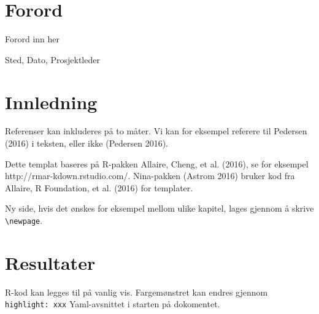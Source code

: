 \documentclass[11pt, a4paper]{article}
\newenvironment{Shaded}{\begin{snugshade}}{\end{snugshade}}
\newcommand{\KeywordTok}[1]{\textcolor[rgb]{0.13,0.29,0.53}{\textbf{{#1}}}}
\newcommand{\DataTypeTok}[1]{\textcolor[rgb]{0.13,0.29,0.53}{{#1}}}
\newcommand{\DecValTok}[1]{\textcolor[rgb]{0.00,0.00,0.81}{{#1}}}
\newcommand{\FloatTok}[1]{\textcolor[rgb]{0.00,0.00,0.81}{{#1}}}
\newcommand{\CharTok}[1]{\textcolor[rgb]{0.31,0.60,0.02}{{#1}}}
\newcommand{\StringTok}[1]{\textcolor[rgb]{0.31,0.60,0.02}{{#1}}}
\newcommand{\CommentTok}[1]{\textcolor[rgb]{0.56,0.35,0.01}{\textit{{#1}}}}
\newcommand{\NormalTok}[1]{{#1}}
\begin{document}
\clearpage
\doublespacing
\tableofcontents
{}
\singlespacing
\clearpage

\section{Forord}

\normalsize
Forord inn her\par
\medskip
Sted, Dato, Prosjektleder



\clearpage
\setcounter{secnumdepth}{1}


\section{Innledning}\label{innledning}

Referenser kan inkluderes på to måter. Vi kan for eksempel referere til
Pedersen (2016) i teksten, eller ikke (Pedersen 2016).

Dette templat baseres på R-pakken Allaire, Cheng, et al. (2016), se for
eksempel http://rmar-kdown.rstudio.com/. Nina-pakken (Astrom 2016)
bruker kod fra Allaire, R Foundation, et al. (2016) for templater.

Ny side, hvis det ønskes for eksempel mellom ulike kapitel, lages
gjennom å skrive \texttt{\textbackslash{}newpage}. \newpage

\section{Resultater}\label{resultater}

R-kod kan legges til på vanlig vis. Fargemønstret kan endres gjennom
\texttt{highlight:\ xxx} Yaml-avsnittet i starten på dokomentet.

\begin{Shaded}
\end{Shaded}
\end{document}

